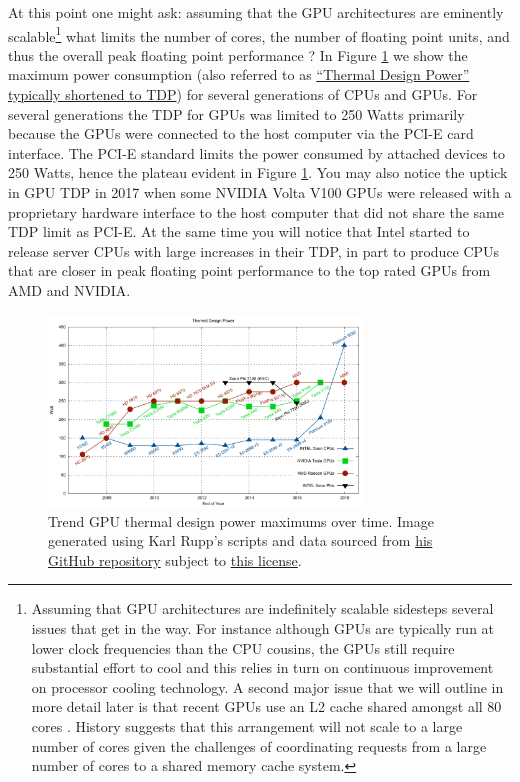 At this point one might ask: assuming that the GPU architectures are eminently scalable\footnote{Assuming that GPU architectures are indefinitely scalable sidesteps several issues that get in the way. For instance although GPUs are typically run at lower clock frequencies than the CPU cousins, the GPUs still require substantial effort to cool and this relies in turn on continuous improvement on processor cooling technology. A second major issue that we will outline in more detail later is that recent GPUs use an L2 cache shared amongst all 80 cores \cite{jia2018dissecting}. History suggests that this arrangement will not scale to a large number of cores given the challenges of coordinating requests from a large number of cores to a shared memory cache system.} what limits the number of cores, the number of floating point units, and thus the overall peak floating point performance ? In Figure \ref{GPUTdpTrends.fig} we show the maximum power consumption (also referred to as \href{https://en.wikipedia.org/wiki/Thermal_design_power}{``Thermal Design Power'' typically shortened to TDP}) for several generations of CPUs and GPUs. For several generations the TDP for GPUs was limited to 250 Watts primarily because the GPUs were connected to the host computer via the PCI-E card interface. The PCI-E standard limits the power consumed by attached devices to 250 Watts, hence the plateau evident in Figure \ref{GPUTdpTrends.fig}. You may also notice the uptick in GPU TDP in 2017 when some NVIDIA Volta V100 GPUs were released with a proprietary hardware interface to the host computer that did not share the same TDP limit as PCI-E.  At the same time you will notice that Intel started to release server CPUs with large increases in their TDP, in part to produce CPUs that are closer in peak floating point performance to the top rated GPUs from AMD and NVIDIA.

\begin{figure}[htbp!]
    \centering
    \includegraphics[width=0.75\textwidth]{figures/L24/tdp.pdf}
    \caption{Trend GPU thermal design power maximums over time. Image generated using Karl Rupp's scripts and data sourced from \href{https://github.com/karlrupp/cpu-gpu-mic-comparison}{his GitHub repository} subject to \href{https://github.com/karlrupp/cpu-gpu-mic-comparison/blob/master/LICENSE.txt}{this license}. }
    \label{GPUTdpTrends.fig}
\end{figure}



